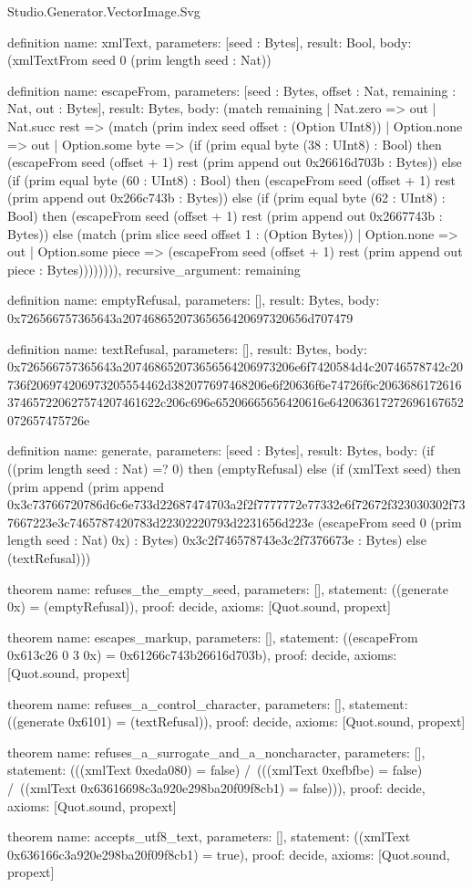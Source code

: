 \begin{lexlean}{Studio.Generator.VectorImage.Svg}
\begin{semanticmodule}
definition{
  name: xmlText,
  parameters: [seed : Bytes],
  result: Bool,
  body: (xmlTextFrom seed 0 (prim length seed : Nat))
}

definition{
  name: escapeFrom,
  parameters: [seed : Bytes, offset : Nat, remaining : Nat, out : Bytes],
  result: Bytes,
  body: (match remaining
    | Nat.zero => out
    | Nat.succ rest => (match (prim index seed offset : (Option UInt8))
      | Option.none => out
      | Option.some byte => (if (prim equal byte (38 : UInt8) : Bool) then (escapeFrom seed (offset + 1) rest (prim append out 0x26616d703b : Bytes)) else (if (prim equal byte (60 : UInt8) : Bool) then (escapeFrom seed (offset + 1) rest (prim append out 0x266c743b : Bytes)) else (if (prim equal byte (62 : UInt8) : Bool) then (escapeFrom seed (offset + 1) rest (prim append out 0x2667743b : Bytes)) else (match (prim slice seed offset 1 : (Option Bytes))
        | Option.none => out
        | Option.some piece => (escapeFrom seed (offset + 1) rest (prim append out piece : Bytes)))))))),
  recursive_argument: remaining
}

definition{
  name: emptyRefusal,
  parameters: [],
  result: Bytes,
  body: 0x726566757365643a20746865207365656420697320656d707479
}

definition{
  name: textRefusal,
  parameters: [],
  result: Bytes,
  body: 0x726566757365643a207468652073656564206973206e6f7420584d4c20746578742c20736f206974206973205554462d382077697468206e6f20636f6e74726f6c2063686172616374657220627574207461622c206c696e65206665656420616e642063617272696167652072657475726e
}

definition{
  name: generate,
  parameters: [seed : Bytes],
  result: Bytes,
  body: (if ((prim length seed : Nat) =? 0) then (emptyRefusal) else (if (xmlText seed) then (prim append (prim append 0x3c73766720786d6c6e733d22687474703a2f2f7777772e77332e6f72672f323030302f737667223e3c7465787420783d22302220793d2231656d223e (escapeFrom seed 0 (prim length seed : Nat) 0x) : Bytes) 0x3c2f746578743e3c2f7376673e : Bytes) else (textRefusal)))
}

theorem{
  name: refuses_the_empty_seed,
  parameters: [],
  statement: ((generate 0x) = (emptyRefusal)),
  proof: decide{},
  axioms: [Quot.sound, propext]
}

theorem{
  name: escapes_markup,
  parameters: [],
  statement: ((escapeFrom 0x613c26 0 3 0x) = 0x61266c743b26616d703b),
  proof: decide{},
  axioms: [Quot.sound, propext]
}

theorem{
  name: refuses_a_control_character,
  parameters: [],
  statement: ((generate 0x6101) = (textRefusal)),
  proof: decide{},
  axioms: [Quot.sound, propext]
}

theorem{
  name: refuses_a_surrogate_and_a_noncharacter,
  parameters: [],
  statement: (((xmlText 0xeda080) = false) /\ (((xmlText 0xefbfbe) = false) /\ ((xmlText 0x63616698c3a920e298ba20f09f8cb1) = false))),
  proof: decide{},
  axioms: [Quot.sound, propext]
}

theorem{
  name: accepts_utf8_text,
  parameters: [],
  statement: ((xmlText 0x636166c3a920e298ba20f09f8cb1) = true),
  proof: decide{},
  axioms: [Quot.sound, propext]
}
\end{semanticmodule}
\end{lexlean}
